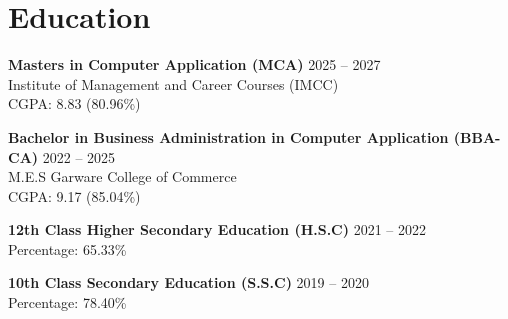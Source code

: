 \documentclass[a4paper,10pt]{article}
\begin{document}
\section*{Education}

\textbf{Masters in Computer Application (MCA)} \hfill 2025 -- 2027\\
Institute of Management and Career Courses (IMCC)\\
CGPA: 8.83 (80.96\%)

\vspace{4pt} 

\textbf{Bachelor in Business Administration in Computer Application (BBA-CA)} \hfill 2022 -- 2025\\
M.E.S Garware College of Commerce\\
CGPA: 9.17 (85.04\%)

\vspace{4pt} 

\textbf{12th Class Higher Secondary Education (H.S.C)} \hfill 2021 -- 2022\\
Percentage: 65.33\%

\vspace{4pt} 

\textbf{10th Class Secondary Education (S.S.C)} \hfill 2019 -- 2020\\
Percentage: 78.40\%
\end{document}
